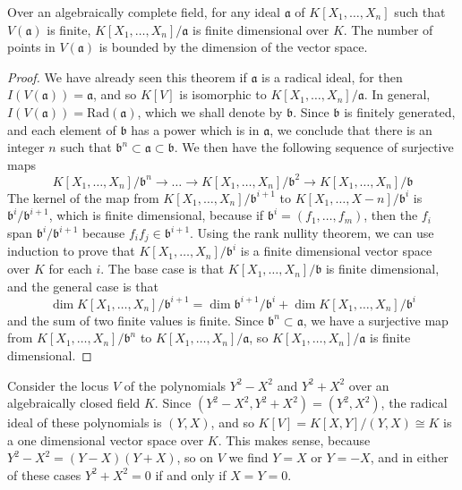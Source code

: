 \begin{lemma}
    Over an algebraically complete field, for any ideal $\mathfrak{a}$ of $K[X_1, \dots, X_n]$ such that $V(\mathfrak{a})$ is finite, $K[X_1, \dots, X_n]/\mathfrak{a}$ is finite dimensional over $K$. The number of points in $V(\mathfrak{a})$ is bounded by the dimension of the vector space.
\end{lemma}
\begin{proof}
    We have already seen this theorem if $\mathfrak{a}$ is a radical ideal, for then $I(V(\mathfrak{a})) = \mathfrak{a}$, and so $K[V]$ is isomorphic to $K[X_1, \dots, X_n]/\mathfrak{a}$. In general, $I(V(\mathfrak{a})) = \text{Rad}(\mathfrak{a})$, which we shall denote by $\mathfrak{b}$. Since $\mathfrak{b}$ is finitely generated, and each element of $\mathfrak{b}$ has a power which is in $\mathfrak{a}$, we conclude that there is an integer $n$ such that $\mathfrak{b}^n \subset \mathfrak{a} \subset \mathfrak{b}$. We then have the following sequence of surjective maps
    \[ K[X_1, \dots, X_n]/\mathfrak{b}^n \to \dots \to K[X_1, \dots, X_n]/\mathfrak{b}^2 \to K[X_1, \dots, X_n]/\mathfrak{b} \]
    The kernel of the map from $K[X_1, \dots, X_n]/\mathfrak{b}^{i+1}$ to $K[X_1, \dots, X-n]/\mathfrak{b}^i$ is $\mathfrak{b}^i/\mathfrak{b}^{i+1}$, which is finite dimensional, because if $\mathfrak{b}^i = (f_1, \dots, f_m)$, then the $f_i$ span $\mathfrak{b}^i/\mathfrak{b}^{i+1}$ because $f_if_j \in \mathfrak{b}^{i+1}$. Using the rank nullity theorem, we can use induction to prove that $K[X_1, \dots, X_n]/\mathfrak{b}^i$ is a finite dimensional vector space over $K$ for each $i$. The base case is that $K[X_1, \dots, X_n]/\mathfrak{b}$ is finite dimensional, and the general case is that
    \[ \dim K[X_1, \dots, X_n]/\mathfrak{b}^{i+1} = \dim \mathfrak{b}^{i+1}/\mathfrak{b}^i + \dim K[X_1, \dots, X_n]/\mathfrak{b}^i \]
    and the sum of two finite values is finite. Since $\mathfrak{b}^n \subset \mathfrak{a}$, we have a surjective map from $K[X_1, \dots, X_n]/\mathfrak{b}^n$ to $K[X_1, \dots, X_n]/\mathfrak{a}$, so $K[X_1, \dots, X_n]/\mathfrak{a}$ is finite dimensional.
\end{proof}

\begin{example}
    Consider the locus $V$ of the polynomials $Y^2 - X^2$ and $Y^2 + X^2$ over an algebraically closed field $K$. Since $(Y^2 - X^2, Y^2 + X^2) = (Y^2,X^2)$, the radical ideal of these polynomials is $(Y,X)$, and so $K[V] = K[X,Y]/(Y,X) \cong K$ is a one dimensional vector space over $K$. This makes sense, because $Y^2 - X^2 = (Y-X)(Y+X)$, so on $V$ we find $Y = X$ or $Y = -X$, and in either of these cases $Y^2 + X^2 = 0$ if and only if $X = Y = 0$.
\end{example}

